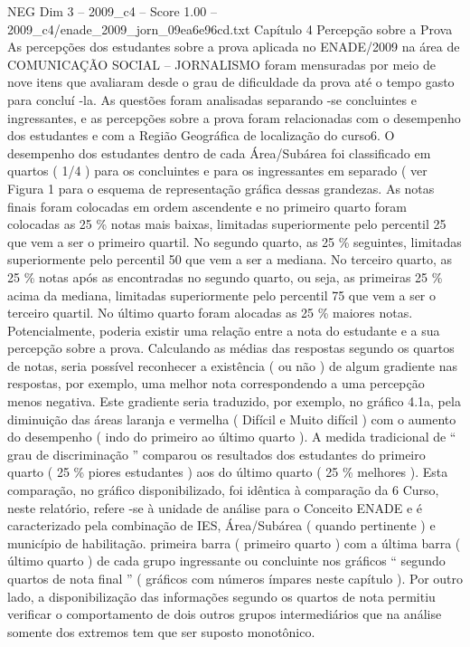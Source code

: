 \begin{textsample}{NEG Dim 3 – 2009\_c4 – Score 1.00 – 2009\_c4/enade\_2009\_jorn\_09ea6e96cd.txt}  \label{ex:f3_neg_158}
Capítulo 4 Percepção sobre a Prova As percepções dos estudantes sobre a prova aplicada no ENADE/2009 na área de COMUNICAÇÃO SOCIAL – JORNALISMO foram mensuradas por meio de nove itens que avaliaram desde o grau de dificuldade da prova até o tempo gasto para concluí -la.
As questões foram analisadas separando -se concluintes e ingressantes, e as percepções sobre a prova foram relacionadas com o desempenho dos estudantes e com a Região Geográfica de localização do curso6.
O desempenho dos estudantes dentro de cada Área/Subárea foi classificado em quartos ( 1/4 ) para os concluintes e para os ingressantes em separado ( ver Figura 1 para o esquema de representação gráfica dessas grandezas.
As notas finais foram colocadas em ordem ascendente e no primeiro quarto foram colocadas as 25 \% notas mais baixas, limitadas superiormente pelo percentil 25 que vem a ser o primeiro quartil.
No segundo quarto, as 25 \% seguintes, limitadas superiormente pelo percentil 50 que vem a ser a mediana.
No terceiro quarto, as 25 \% notas após as encontradas no segundo quarto, ou seja, as primeiras 25 \% acima da mediana, limitadas superiormente pelo percentil 75 que vem a ser o terceiro quartil.
No último quarto foram alocadas as 25 \% maiores notas.
Potencialmente, poderia existir uma relação entre a nota do estudante e a sua percepção sobre a prova.
Calculando as médias das respostas segundo os quartos de notas, seria possível reconhecer a existência ( ou não ) de algum gradiente nas respostas, por exemplo, uma melhor nota correspondendo a uma percepção menos negativa.
Este gradiente seria traduzido, por exemplo, no gráfico 4.1a, pela diminuição das áreas laranja e vermelha ( Difícil e Muito difícil ) com o aumento do desempenho ( indo do primeiro ao último quarto ).
A medida tradicional de “ grau de discriminação ” comparou os resultados dos estudantes do primeiro quarto ( 25 \% piores estudantes ) aos do último quarto ( 25 \% melhores ).
Esta comparação, no gráfico disponibilizado, foi idêntica à comparação da 6 Curso, neste relatório, refere -se à unidade de análise para o Conceito ENADE e é caracterizado pela combinação de IES, Área/Subárea ( quando pertinente ) e município de habilitação. primeira barra ( primeiro quarto ) com a última barra ( último quarto ) de cada grupo ingressante ou concluinte nos gráficos “ segundo quartos de nota final ” ( gráficos com números ímpares neste capítulo ).
Por outro lado, a disponibilização das informações segundo os quartos de nota permitiu verificar o comportamento de dois outros grupos intermediários que na análise somente dos extremos tem que ser suposto monotônico.

\end{textsample}
